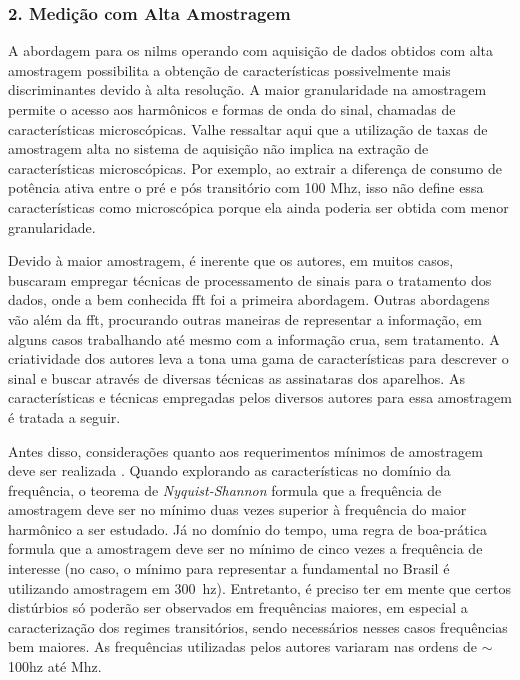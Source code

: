 \subsubsection{2. Medição com Alta Amostragem}
\label{top:nilm_alta_am}

A abordagem para os \glspl{nilm} operando com aquisição de dados
obtidos com alta amostragem possibilita a obtenção de características
possivelmente mais discriminantes devido à alta resolução. A maior
granularidade na amostragem permite o acesso aos harmônicos e formas
de onda do sinal, chamadas de características microscópicas. Valhe
ressaltar aqui que a utilização de taxas de amostragem alta no
sistema de aquisição não implica na extração de características
microscópicas. Por exemplo, ao extrair a diferença de consumo de
potência ativa entre o pré e pós transitório com 100 M\acs{hz},
isso não define essa características como microscópica porque ela
ainda poderia ser obtida com menor granularidade.
 
Devido à maior amostragem, é inerente que os autores, em muitos casos,
buscaram empregar técnicas de processamento de sinais para o
tratamento dos dados, onde a bem conhecida \gls{fft} foi a primeira
abordagem. Outras abordagens vão além da \gls{fft}, procurando outras
maneiras de representar a informação, em alguns casos trabalhando até
mesmo com a informação crua, sem tratamento. A criatividade dos
autores leva a tona uma gama de características para descrever o sinal
e buscar através de diversas técnicas as assinataras dos aparelhos. As
características e técnicas empregadas pelos diversos autores para essa
amostragem é tratada a seguir.

Antes disso, considerações quanto aos requerimentos mínimos de
amostragem deve ser realizada \cite{nilm_matthews_overview_2008_22}.
Quando explorando as características no domínio da frequência, o
teorema de \emph{Nyquist-Shannon} formula que a frequência de
amostragem deve ser no mínimo duas vezes superior à frequência do
maior harmônico a ser estudado. Já no domínio do tempo, uma regra de
boa-prática formula que a amostragem deve ser no mínimo de cinco vezes
a frequência de interesse (no caso, o mínimo para representar a
fundamental no Brasil é utilizando amostragem em 300~\acs{hz}).
Entretanto, é preciso ter em mente que certos distúrbios só poderão
ser observados em frequências maiores, em especial a caracterização
dos regimes transitórios, sendo necessários nesses casos frequências
bem maiores. As frequências utilizadas pelos autores variaram nas
ordens de $\sim$100\acs{hz} até M\acs{hz}.


